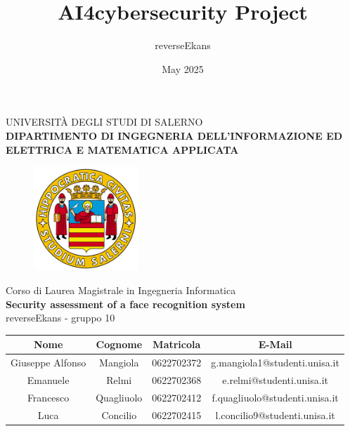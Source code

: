 \documentclass[a4paper, oneside]{book}
\title{AI4cybersecurity Project}
\author{reverseEkans}
\date{May 2025}
\begin{document}
    \begin{titlepage}
        \begin{center}
            \LARGE{\uppercase{Università degli Studi di Salerno}}\\
            \vspace{5mm}
        	\uppercase{\normalsize \textbf{Dipartimento di Ingegneria dell'Informazione ed Elettrica e Matematica Applicata} }\\
        \end{center}
        
        \begin{figure}[H]
            \centering
            \includegraphics[width=0.35\textwidth]{images/logo_unisa.png}
        \end{figure}
        
        \begin{center}
        	\normalsize{ Corso di Laurea Magistrale in Ingegneria Informatica }\\
        	\vspace{15mm}
            {\Large{\bf \textbf{Security assessment of a
face recognition system}}}\\
        	\vspace{15mm}
            {\Large{reverseEkans - gruppo 10}}
            \vspace{10mm}
        \end{center}

        \begin{center}
            \begin{tabular}{ | c | c | c | c |} \hline
                \textbf{Nome} & \textbf{Cognome} & \textbf{Matricola} & \textbf{E-Mail} \\
                \hline
                Giuseppe Alfonso & Mangiola & 0622702372 & g.mangiola1@studenti.unisa.it \\
                \hline
                Emanuele & Relmi & 0622702368 & e.relmi@studenti.unisa.it\\
                \hline
                Francesco & Quagliuolo & 0622702412 & f.quagliuolo@studenti.unisa.it\\
                \hline
                Luca & Concilio & 0622702415 & l.concilio9@studenti.unisa.it\\
                \hline
            \end{tabular}
        \end{center}
        

\end{titlepage}
\end{document}
